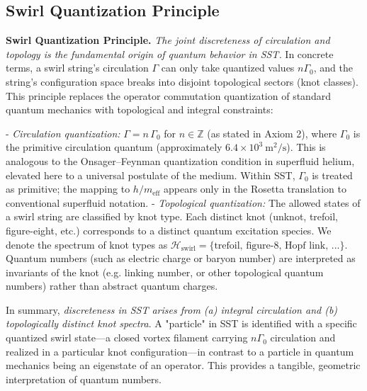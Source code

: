 \documentclass[10pt,reprint,aps,onecolumn,nofootinbib]{revtex4-2}
\begin{document}

	\subsection*{Swirl Quantization Principle}
	\textbf{Swirl Quantization Principle.} \emph{The joint discreteness of circulation and topology is the fundamental origin of quantum behavior in SST.} In concrete terms, a swirl string's circulation $\Gamma$ can only take quantized values $n\Gamma_0$, and the string's configuration space breaks into disjoint topological sectors (knot classes). This principle replaces the operator commutation quantization of standard quantum mechanics with topological and integral constraints:

	- \emph{Circulation quantization:} $\Gamma = n\,\Gamma_0$ for $n\in\mathbb{Z}$ (as stated in Axiom 2), where $\Gamma_0$ is the primitive circulation quantum (approximately $6.4\times 10^{3}~\mathrm{m^2/s}$). This is analogous to the Onsager–Feynman quantization condition in superfluid helium, elevated here to a universal postulate of the medium. Within SST, $\Gamma_0$ is treated as primitive; the mapping to $h/m_{\text{eff}}$ appears only in the Rosetta translation to conventional superfluid notation.
	- \emph{Topological quantization:} The allowed states of a swirl string are classified by knot type. Each distinct knot (unknot, trefoil, figure-eight, etc.) corresponds to a distinct quantum excitation species. We denote the spectrum of knot types as $\mathcal{H}_{\text{swirl}} = \{\text{trefoil, figure-8, Hopf link, ...}\}$. Quantum numbers (such as electric charge or baryon number) are interpreted as invariants of the knot (e.g. linking number, or other topological quantum numbers) rather than abstract quantum charges.

	In summary, \emph{discreteness in SST arises from (a) integral circulation and (b) topologically distinct knot spectra}. A "particle" in SST is identified with a specific quantized swirl state—a closed vortex filament carrying $n\Gamma_0$ circulation and realized in a particular knot configuration—in contrast to a particle in quantum mechanics being an eigenstate of an operator. This provides a tangible, geometric interpretation of quantum numbers.

\end{document}
